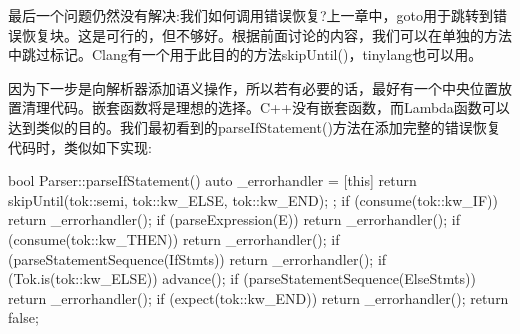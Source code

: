 最后一个问题仍然没有解决:我们如何调用错误恢复?上一章中，goto用于跳转到错误恢复块。这是可行的，但不够好。根据前面讨论的内容，我们可以在单独的方法中跳过标记。Clang有一个用于此目的的方法skipUntil()，tinylang也可以用。

因为下一步是向解析器添加语义操作，所以若有必要的话，最好有一个中央位置放置清理代码。嵌套函数将是理想的选择。C++没有嵌套函数，而Lambda函数可以达到类似的目的。我们最初看到的parseIfStatement()方法在添加完整的错误恢复代码时，类似如下实现:

\begin{cpp}
bool Parser::parseIfStatement() {
    auto _errorhandler = [this] {
        return skipUntil(tok::semi, tok::kw_ELSE, tok::kw_END);
    };
    if (consume(tok::kw_IF))
        return _errorhandler();
    if (parseExpression(E))
        return _errorhandler();
    if (consume(tok::kw_THEN))
        return _errorhandler();
    if (parseStatementSequence(IfStmts))
        return _errorhandler();
    if (Tok.is(tok::kw_ELSE)) {
        advance();
        if (parseStatementSequence(ElseStmts))
        return _errorhandler();
    }
    if (expect(tok::kw_END))
        return _errorhandler();
    return false;
}
\end{cpp}


